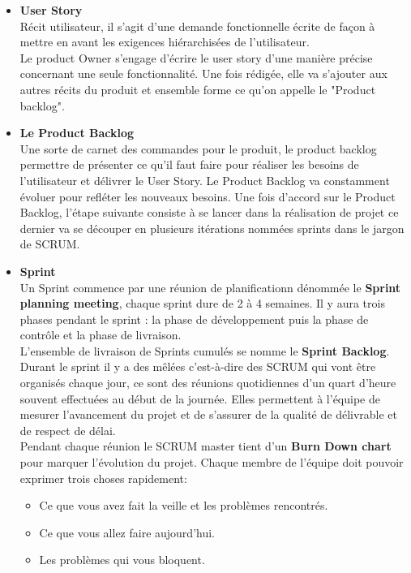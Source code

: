 \begin{enumerate}
	\begin{itemize}
		\item \textbf{User Story}\\
		Récit utilisateur, il s'agit d'une demande fonctionnelle écrite de façon à mettre en avant les exigences hiérarchisées de l'utilisateur.\\Le product Owner s'engage d'écrire le user story d'une manière précise concernant une seule fonctionnalité. Une fois rédigée, elle va s'ajouter aux autres récits du produit et ensemble forme ce qu'on appelle le "Product backlog".
		\item \textbf{ Le Product Backlog}\\Une sorte de carnet des commandes pour le produit, le product backlog permettre de présenter ce qu'il faut faire pour réaliser les besoins de l'utilisateur et délivrer le User Story. Le Product Backlog va constamment évoluer pour refléter les nouveaux besoins. Une fois d'accord sur le Product Backlog, l'étape suivante consiste à se lancer dans la réalisation de projet ce dernier va se découper en plusieurs itérations nommées sprints dans le jargon de SCRUM.
		\item \textbf{Sprint}\\
		Un Sprint commence par une réunion de planificationn dénommée le \textbf{Sprint planning meeting}, chaque sprint dure de 2 à 4 semaines. Il y aura trois phases pendant le sprint : la phase de développement puis la phase de contrôle et la phase de livraison.\\
		L'ensemble de livraison de Sprints cumulés se nomme le \textbf{Sprint Backlog}.\\
		Durant le sprint il y a des mêlées c'est-à-dire des SCRUM qui vont être organisés chaque jour, ce sont des réunions quotidiennes d'un quart d'heure souvent effectuées au début de la journée. Elles permettent à l'équipe de mesurer l'avancement du projet et de s'assurer de la qualité de délivrable et de respect de délai.\\
		Pendant chaque réunion le SCRUM master tient d'un \textbf{Burn Down chart} pour marquer l'évolution du projet. Chaque membre de l'équipe doit pouvoir exprimer trois choses rapidement:
		\begin{itemize}
			\item Ce que vous avez fait la veille et les problèmes rencontrés.
			\item Ce que vous allez faire aujourd'hui.
			\item Les problèmes qui vous bloquent.
		\end{itemize}  

\end{itemize}
\end{enumerate}
